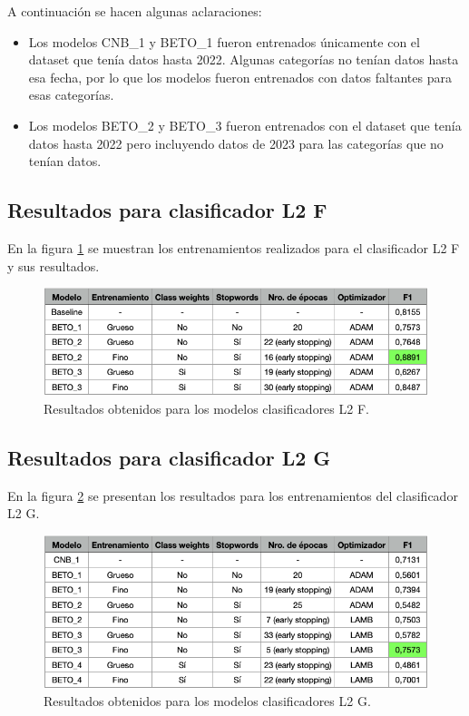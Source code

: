 A continuación se hacen algunas aclaraciones:
\begin{itemize}
	\item Los modelos CNB\_1 y BETO\_1 fueron entrenados únicamente con el dataset que tenía datos hasta 2022. Algunas categorías no tenían datos hasta esa fecha, por lo que los modelos fueron entrenados con datos faltantes para esas categorías.
	\item Los modelos BETO\_2 y BETO\_3 fueron entrenados con el dataset que tenía datos hasta 2022 pero incluyendo datos de 2023 para las categorías que no tenían datos.
\end{itemize}

\subsection{Resultados para clasificador L2 F}

En la figura \ref{fig:res-l2f} se muestran los entrenamientos realizados para el clasificador L2 F y sus resultados.

\begin{figure}[H]
	\centering
	\includegraphics[width=1\textwidth]{./Figures/cap4-resultados-l2f.png}
	\caption{Resultados obtenidos para los modelos clasificadores L2 F.}
	\label{fig:res-l2f}
\end{figure}

\newpage

\subsection{Resultados para clasificador L2 G}

En la figura \ref{fig:res-l2g} se presentan los resultados para los entrenamientos del clasificador L2 G.

\begin{figure}[H]
	\centering
	\includegraphics[width=1\textwidth]{./Figures/cap4-resultados-l2g.png}
	\caption{Resultados obtenidos para los modelos clasificadores L2 G.}
	\label{fig:res-l2g}
\end{figure}

